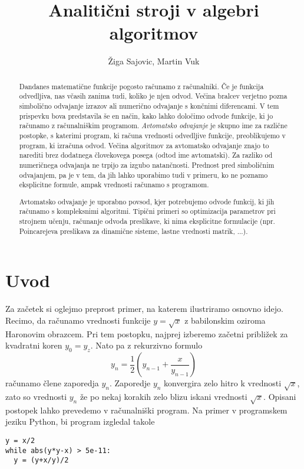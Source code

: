 \documentclass{article}
\title{Analitični stroji v algebri algoritmov}
\author{Žiga Sajovic, Martin Vuk}
\begin{document}
\maketitle
\begin{abstract}
  Dandanes matematične funkcije pogosto računamo z računalniki. Če je funkcija
  odvedljiva, nas včasih zanima tudi, koliko je njen odvod. Večina bralcev verjetno
  pozna simbolično odvajanje izrazov ali numerično odvajanje s končnimi
  diferencami. V tem prispevku bova predstavila še en način, kako lahko določimo
  odvode funkcije, ki jo računamo z računalniškim programom. \emph{Avtomatsko
    odvajanje} je skupno ime za različne postopke, s katerimi program, ki računa
  vrednosti odvedljive funkcije, preoblikujemo v program, ki izračuna odvod. 
  Večina algoritmov za avtomatsko odvajanje znajo to narediti brez dodatnega
  človekovega posega (odtod ime avtomatski). Za razliko
  od numeričnega odvajanja ne trpijo za izgubo natančnosti. Prednost pred
  simboličnim odvajanjem, pa je v tem, da jih lahko uporabimo tudi v primeru, ko
  ne poznamo eksplicitne formule, ampak vrednosti računamo s programom.

  Avtomatsko odvajanje je uporabno povsod, kjer potrebujemo 
  odvode funkcij, ki jih računamo s kompleksnimi algoritmi. Tipični primeri so
  optimizacija parametrov pri strojnem učenju, računanje odvoda preslikave, ki nima
  eksplicitne formulacije (npr. Poincarejeva preslikava za dinamične sisteme,
  lastne vrednosti matrik, ...).
\end{abstract}
\section{Uvod}
Za začetek si oglejmo preprost primer, na katerem ilustriramo osnovno idejo.
Recimo, da računamo vrednosti funkcije $y=\sqrt{x}$ z babilonskim oziroma Haronovim obrazcem.
Pri tem postopku, najprej izberemo začetni približek za
kvadratni koren $y_0=y_z$. Nato pa z rekurzivno formulo
\begin{equation*}
  y_n=\frac{1}{2}\left( y_{n-1}+\frac{x}{y_{n-1}} \right)
\end{equation*}
računamo člene zaporedja $y_n$. Zaporedje $y_n$ konvergira zelo hitro k
vrednosti $\sqrt{x}$, zato so vrednosti $y_n$ že po nekaj korakih zelo blizu
iskani vrednosti $\sqrt{x}$. Opisani postopek lahko prevedemo v računalniški
program. Na primer v programskem jeziku Python, bi program izgledal takole 

\begin{verbatim}
y = x/2
while abs(y*y-x) > 5e-11:
  y = (y+x/y)/2
\end{verbatim}
\end{document}
